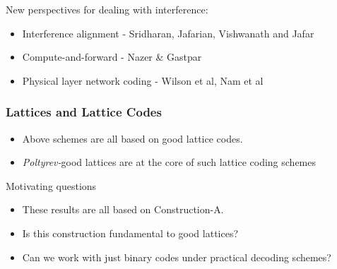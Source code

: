 \documentclass[10pt]{beamer}
\begin{document}
\begin{frame}
New perspectives for dealing with interference:
      \begin{itemize}
     		\item<1-> Interference alignment - Sridharan, Jafarian, Vishwanath and Jafar
			\item<2-> Compute-and-forward - Nazer \& Gastpar
			\item<2-> Physical layer network coding - Wilson et al, Nam et al
      \end{itemize}
			\vspace{2.5em}
			
	\begin{figure}
		\centering
	\end{figure}
\end{frame}  

\begin{frame}\frametitle{Lattices and Lattice Codes}
\begin{block}{}
			\begin{itemize}
				\item Above schemes are all based on good lattice codes.
				\item	\textit{Poltyrev-}good lattices are at the core of such lattice coding schemes
			\end{itemize}
\end{block}
\pause
\vspace{0.3in}
		\begin{block}{Motivating questions}
			\begin{center}
				\begin{itemize}
						\item These results are all based on Construction-A.
						\item<2-> Is this construction fundamental to good lattices?
						\item<2-> Can we work with just binary codes under practical decoding schemes?
				\end{itemize}
			\end{center}
		\end{block}

\end{frame}
\end{document}
